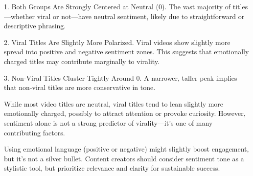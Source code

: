 \documentclass[a4paper]{article}
\begin{document}
1. Both Groups Are Strongly Centered at Neutral (0).
The vast majority of titles—whether viral or not—have neutral sentiment, likely due to straightforward or descriptive phrasing.

2. Viral Titles Are Slightly More Polarized.
Viral videos show slightly more spread into positive and negative sentiment zones.
This suggests that emotionally charged titles may contribute marginally to virality.

3. Non-Viral Titles Cluster Tightly Around 0.
A narrower, taller peak implies that non-viral titles are more conservative in tone.

While most video titles are neutral, viral titles tend to lean slightly more emotionally charged, possibly to attract attention or provoke curiosity. However, sentiment alone is not a strong predictor of virality—it's one of many contributing factors.

Using emotional language (positive or negative) might slightly boost engagement, but it's not a silver bullet.
Content creators should consider sentiment tone as a stylistic tool, but prioritize relevance and clarity for sustainable success.
\end{document}
